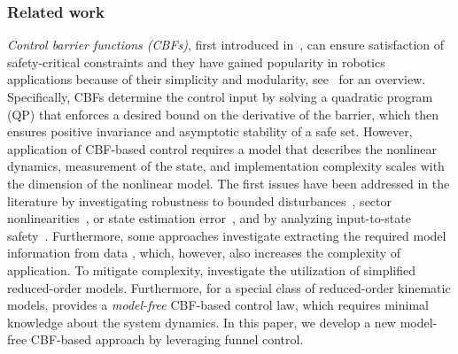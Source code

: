 \documentclass[journal,twoside,web]{ieeeconf}
\begin{document}
\subsubsection*{Related work}
\textit{Control barrier functions (CBFs)}, first introduced in~\cite{wieland2007constructive}, can ensure satisfaction of safety-critical constraints and they have gained popularity in robotics applications because of their simplicity and modularity, see~\cite{ames2016control,ames2019control} for an overview. 
Specifically, CBFs determine the control input by solving a quadratic program (QP) that enforces a desired bound on the derivative of the barrier, which then ensures positive invariance and asymptotic stability of a safe set. However, application of CBF-based control requires a model that describes the nonlinear dynamics, measurement of the state, and implementation complexity scales with the dimension of the nonlinear model. 
The first issues have been addressed in the literature by investigating robustness to bounded disturbances~\cite{jankovic2018robust,gurriet2018towards}, sector nonlinearities~\cite{buch2021robust}, or state estimation error~\cite{dean2021guaranteeing}, and by analyzing input-to-state safety~\cite{alan2023control,kolathaya2018input}. Furthermore, some approaches investigate extracting the required model information from data  \cite{taylor2020learning,dhiman2021control}, which, however, also increases the complexity of application. 
To mitigate complexity, \cite{cohen2024safety} investigate the utilization of simplified reduced-order models. 
Furthermore, for a special class of reduced-order kinematic models, \cite{molnar2021model} provides a \textit{model-free} CBF-based control law, which requires minimal knowledge about the system dynamics. 
In this paper, we develop a new model-free CBF-based approach by leveraging funnel control.
\end{document}
